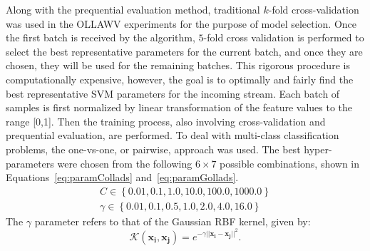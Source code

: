 \documentclass[reqno]{vcuthesis}
\newcommand{\set}[1]{{\left\{#1\right\}}}
\newcommand{\norm}[1]{{||#1||}}
\numberwithin{equation}{chapter}
\begin{document}
Along with the prequential evaluation method, traditional $k$-fold cross-validation was used in the OLLAWV experiments for the purpose of model selection. Once the first batch is received by the algorithm, $5$-fold cross validation is performed to select the best representative parameters for the current batch, and once they are chosen, they will be used for the remaining batches. This rigorous procedure is computationally expensive, however, the goal is to optimally and fairly find the best representative SVM parameters for the incoming stream. Each batch of samples is first normalized by linear transformation of the feature values to the range [0,1]. Then the training process, also involving cross-validation and prequential evaluation, are performed. To deal with multi-class classification problems, the one-vs-one, or pairwise, approach was used. The best hyper-parameters were chosen from the following $6 \times 7$ possible combinations, shown in Equations~\eqref{eq:paramCollads} and~\eqref{eq:paramGollads}. 
\begin{subequations}
\label{eq:hyperparamollads}
\begin{align}
C \in \set{0.01, 0.1, 1.0, 10.0, 100.0, 1000.0} \label{eq:paramCollads}\\
\gamma \in \set{0.01, 0.1, 0.5, 1.0, 2.0, 4.0, 16.0} \label{eq:paramGollads}
\end{align}
\end{subequations}
The $\gamma$ parameter refers to that of the Gaussian RBF kernel, given by:
\begin{equation}
\label{eq:rbfds}
\mathcal{K}(\bm{x_i},\bm{x_j}) = e^{-\gamma\norm{\bm{x_i} - \bm{x_j}}^2}.
\end{equation}
\end{document}
